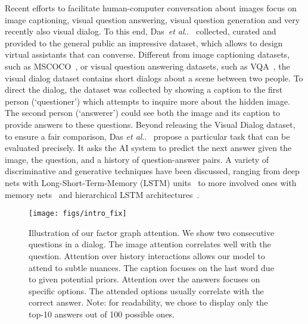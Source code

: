 \documentclass[10pt,twocolumn,letterpaper]{article}
\makeatletter
\def\@onedot{\ifx\@let@token.\else.\null\fi\xspace}
\DeclareRobustCommand\onedot{\futurelet\@let@token\@onedot}
\def\etal{\emph{et al}\onedot}
\makeatother
\begin{document}
Recent efforts to facilitate human-computer conversation about images focus on image captioning, visual question answering, visual question generation and very recently also visual dialog. To this end, Das~\etal~\cite{visdial} collected, curated and provided to the general public an impressive dataset, which allows to design virtual assistants that can converse. Different from image captioning datasets, such as MSCOCO~\cite{lin2014microsoft}, or visual question answering datasets, such as VQA~\cite{AnatolICCV2015}, the visual dialog dataset contains short dialogs about a scene between two people. To direct the dialog, the dataset was collected by showing a caption to the first person (`questioner') which attempts to inquire more about the hidden image. The second person (`answerer') could see both the image and its caption to provide answers to these questions.
Beyond releasing the Visual Dialog dataset, to ensure a fair comparison, Das \etal~\cite{visdial} propose a particular task that can be evaluated precisely. It asks the AI system to predict the next answer given the image, the question, and a history of question-answer pairs. A variety of discriminative and generative techniques have been discussed, ranging from deep nets with Long-Short-Term-Memory (LSTM) units~\cite{HochreiterNC1997} to more involved ones with memory nets~\cite{weston2014memory} and hierarchical LSTM architectures~\cite{serban2017hierarchical}. 

\begin{figure}

\centering
\texttt{[image: figs/intro\_fix]}
\vspace{-0.7cm}
\caption{{\small Illustration of our factor graph attention. We show two consecutive questions in a dialog. The image attention correlates well with the question. Attention over history interactions allows our model to attend to subtle nuances. The caption focuses on the last word due to given potential priors. Attention over the answers focuses on specific  options. The attended options usually correlate with the correct answer. Note:  for readability, we chose to display only the top-10 answers out of 100 possible ones.}}
\label{fig:intro}
\vspace{-0.5cm}
\end{figure}
 
\end{document}

